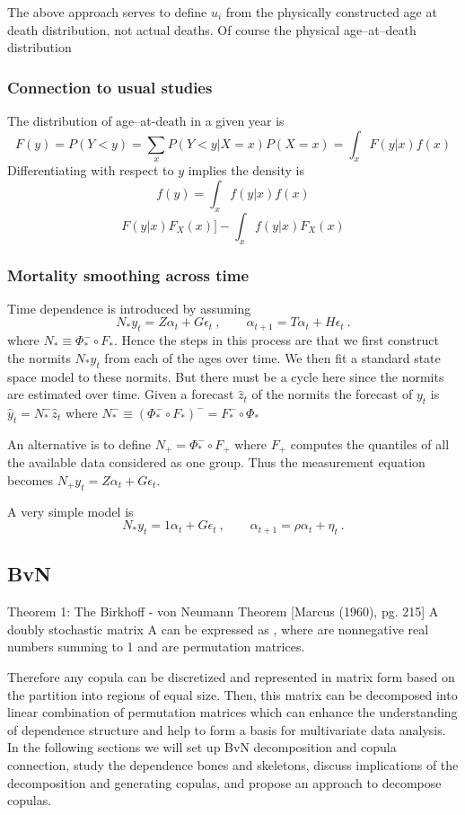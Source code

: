 \documentclass[a4paper,12pt]{article}
\newcommand{\eps}{\epsilon}
\begin{document}
The above approach serves to define $u_i$ from the physically constructed age at death distribution, not actual deaths.   Of course the physical age--at--death distribution


\subsubsection{Connection to usual studies}

The distribution of age--at-death in a given year is
$$
F(y)=P(Y<y)= \sum_x P(Y<y|X=x)P(X=x) = \int_x F(y|x)f(x)
$$
Differentiating with respect to $y$ implies the density is
$$
f(y) = \int_x f(y|x)f(x)
$$
$$
 F(y|x)F_X(x)] - \int_xf(y|x)F_X(x)
$$
\subsubsection{Mortality smoothing across time}

Time dependence is introduced by assuming
$$
N_* y_t=Z\alpha_t+G\eps_t\ , \qquad \alpha_{t+1}=  T\alpha_t + H\eps_t\ .
$$
where $N_*\equiv \Phi_*^-\circ F_*$.  Hence the steps in this process are that we first construct the  normits $N_* y_t$ from each of the ages over time. We then fit a standard state space model to these normits.   But there must be a cycle here since the normits are estimated over time. Given a forecast $\hat z_t$ of the normits the forecast of $y_t$ is $\hat y_t=N_*^-\hat z_t$ where $N_*^-\equiv (\Phi_*^-\circ F_*)^-=F_*^-\circ\Phi_*$

An alternative is to define $N_+=\Phi_*^-\circ F_+$ where $F_+$ computes the quantiles of all the available data considered as one group.  Thus the measurement equation becomes $N_+y_t=Z\alpha_t+G\eps_t$.


A very simple model is
$$
N_* y_t=1\alpha_t+G\eps_t\ , \qquad \alpha_{t+1}=  \rho\alpha_t +\eta_t\ .
$$

\subsection*{BvN}

Theorem 1: The Birkhoff - von Neumann Theorem [Marcus (1960), pg. 215]
A doubly stochastic matrix A can be expressed as  , where   are nonnegative real numbers summing to 1 and   are permutation matrices.

Therefore any copula can be discretized and represented in matrix form based on the partition into   regions of equal size. Then, this matrix can be decomposed into linear combination of permutation matrices which can enhance the understanding of dependence structure and help to form a basis for multivariate data analysis. In the following sections we will set up BvN decomposition and copula connection, study the dependence bones and skeletons, discuss implications of the decomposition and generating copulas, and propose an approach to decompose copulas.
\end{document}
